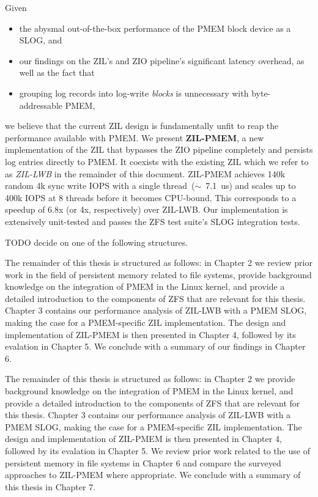 \documentclass[12pt,a4paper,twoside,draft]{book}
\begin{document}
Given
\begin{itemize}[noitemsep]
    \item the abysmal out-of-the-box performance of the PMEM block device as a SLOG, and
    \item our findings on the ZIL's and ZIO pipeline's significant latency overhead, as well as the fact that
    \item grouping log records into log-write \textit{blocks} is unnecessary with byte-addressable PMEM,
\end{itemize}
we believe that the current ZIL design is fundamentally unfit to reap the performance available with PMEM.
We present \textbf{ZIL-PMEM}, a new implementation of the ZIL that bypasses the ZIO pipeline completely and persists log entries directly to PMEM.
It coexists with the existing ZIL which we refer to as \textit{ZIL-LWB} in the remainder of this document.
ZIL-PMEM achieves 140k random 4k sync write IOPS with a single thread~($\sim$~\SI{7.1}{us}) and scales up to 400k IOPS at 8 threads before it becomes CPU-bound.
This corresponds to a speedup of 6.8x (or 4x, respectively) over ZIL-LWB.
Our implementation is extensively unit-tested and passes the ZFS test suite's SLOG integration tests.

TODO decide on one of the following structures.

The remainder of this thesis is structured as follows:
in Chapter 2 we
  review prior work in the field of persistent memory related to file systems,
  provide background knowledge on the integration of PMEM in the Linux kernel,
  and provide a detailed introduction to the components of ZFS that are relevant for this thesis.
Chapter 3 contains our performance analysis of ZIL-LWB with a PMEM SLOG, making the case for a PMEM-specific ZIL implementation.
The design and implementation of ZIL-PMEM is then presented in Chapter 4, followed by its evalation in Chapter 5.
We conclude with a summary of our findings in Chapter 6.

The remainder of this thesis is structured as follows:
in Chapter 2 we
  provide background knowledge on the integration of PMEM in the Linux kernel,
  and provide a detailed introduction to the components of ZFS that are relevant for this thesis.
Chapter 3 contains our performance analysis of ZIL-LWB with a PMEM SLOG, making the case for a PMEM-specific ZIL implementation.
The design and implementation of ZIL-PMEM is then presented in Chapter 4, followed by its evalation in Chapter 5.
We review prior work related to the use of persistent memory in file systems in Chapter 6 and compare the surveyed approaches to ZIL-PMEM where appropriate.
We conclude with a summary of this thesis in Chapter 7.
\end{document}
